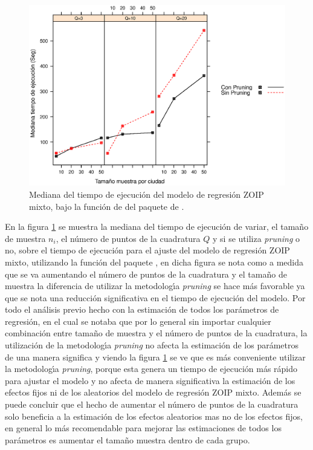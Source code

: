 \begin{figure}
	\begin{center}
		\includegraphics[scale=0.6]{time_mix_ZOIP.eps}	
		\caption{Mediana del tiempo de ejecuci\'{o}n del modelo de regresi\'{o}n ZOIP mixto, bajo la funci\'{o}n de  del paquete  de .}
		\label{time_mix_ZOIP}
	\end{center}
\end{figure}

En la figura \ref{time_mix_ZOIP} se muestra la mediana del tiempo de ejecuci\'{o}n de variar, el tama\~{n}o de muestra $n_i$, el n\'{u}mero de puntos de la cuadratura $Q$ y si se utiliza \textit{pruning} o no, sobre el tiempo de ejecuci\'{o}n para el ajuste del modelo de regresi\'{o}n ZOIP mixto, utilizando la funci\'{o}n  del paquete , en dicha figura se nota como a medida que se va aumentando el n\'{u}mero de puntos de la cuadratura y el tama\~{n}o de muestra la diferencia de utilizar la metodolog\'{\i}a \textit{pruning} se hace m\'{a}s favorable ya que se nota una reducci\'{o}n significativa en el tiempo de ejecuci\'{o}n del modelo. Por todo el an\'{a}lisis previo hecho con la estimaci\'{o}n de todos los par\'{a}metros de regresi\'{o}n, en el cual se notaba que por lo general sin importar cualquier combinaci\'{o}n entre tama\~{n}o de muestra y el n\'{u}mero de puntos de la cuadratura, la utilizaci\'{o}n de la metodolog\'{\i}a \textit{pruning} no afecta la estimaci\'{o}n de los par\'{a}metros de una manera significa y viendo la figura \ref{time_mix_ZOIP} se ve que es m\'{a}s conveniente utilizar la metodolog\'{\i}a \textit{pruning}, porque esta genera un tiempo de ejecuci\'{o}n m\'{a}s r\'{a}pido para ajustar el modelo y no afecta de manera significativa la estimaci\'{o}n de los efectos fijos ni de los aleatorios del modelo de regresi\'{o}n ZOIP mixto. Adem\'{a}s se puede concluir que el hecho de aumentar el n\'{u}mero de puntos de la cuadratura solo beneficia a la estimaci\'{o}n de los efectos aleatorios mas no de los efectos fijos, en general lo m\'{a}s recomendable para mejorar las estimaciones de todos los par\'{a}metros es aumentar el tama\~{n}o muestra dentro de cada grupo.


